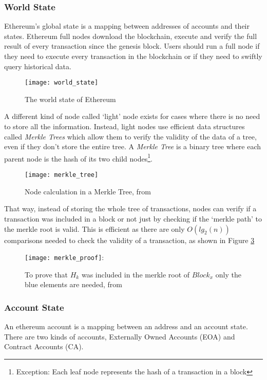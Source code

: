 \subsubsection{World State}
Ethereum's global state is a mapping between addresses of accounts and their states. Ethereum full nodes download the blockchain, execute and verify the full result of every transaction since the genesis block. Users should run a full node if they need to execute every transaction in the blockchain or if they need to swiftly query historical data. 

\begin{figure}[H]
    \centering
    \texttt{[image: world\_state]}
    \caption{The world state of Ethereum}
    \label{fig:worldstate}
\end{figure}

A different kind of node called `light' node exists for cases where there is no need to store all the information. Instead, light nodes use efficient data structures called \textit{Merkle Trees} which allow them to verify the validity of the data of a tree, even if they don't store the entire tree. A \textit{Merkle Tree} is a binary tree where each parent node is the hash of its two child nodes\footnote{Exception: Each leaf node represents the hash of a transaction in a block}. 

\begin{figure}[H]
    \centering
    \texttt{[image: merkle\_tree]}
    \caption{Node calculation in a Merkle Tree, from \cite{smartproperty}}
    \label{fig:merkletree}
\end{figure}

That way, instead of storing the whole tree of transactions, nodes can verify if a transaction was included in a block or not just by checking if the `merkle path' to the merkle root is valid. This is efficient as there are only $O(lg_{2}(n))$ comparisons needed to check the validity of a transaction, as shown in Figure \ref{fig:merkleproof}

\begin{figure}[H]
    \centering
    \texttt{[image: merkle\_proof]}:
    \caption{To prove that $H_{k}$ was included in the merkle root of $Block_{x}$ only the blue elements are needed, from \cite{smartproperty}}
    \label{fig:merkleproof}
\end{figure}

\subsubsection{Account State}
An ethereum account is a mapping between an address and an account state. There are two kinds of accounts, Externally Owned Accounts (EOA) and Contract Accounts (CA).

